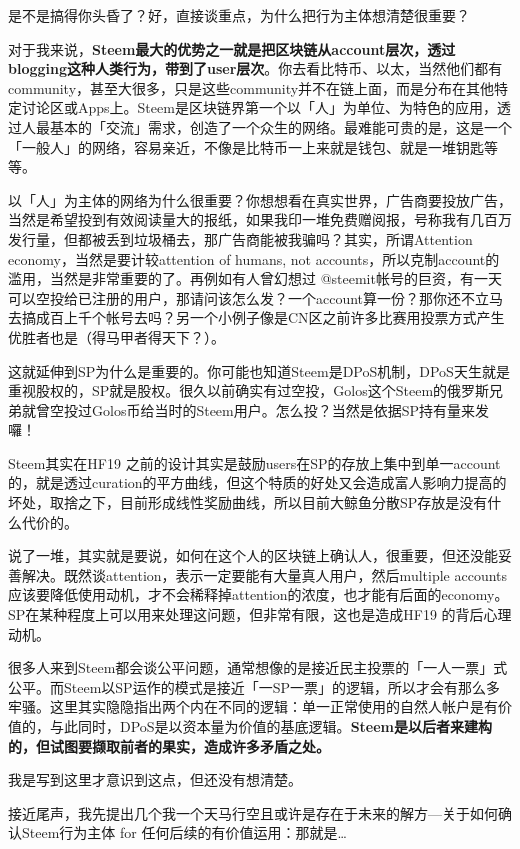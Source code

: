 \documentclass[]{ctexbook}
\begin{document}
是不是搞得你头昏了？好，直接谈重点，为什么把行为主体想清楚很重要？

对于我来说，\textbf{Steem最大的优势之一就是把区块链从account层次，透过blogging这种人类行为，带到了user层次}。你去看比特币、以太，当然他们都有community，甚至大很多，只是这些community并不在链上面，而是分布在其他特定讨论区或Apps上。Steem是区块链界第一个以「人」为单位、为特色的应用，透过人最基本的「交流」需求，创造了一个众生的网络。最难能可贵的是，这是一个「一般人」的网络，容易亲近，不像是比特币一上来就是钱包、就是一堆钥匙等等。

以「人」为主体的网络为什么很重要？你想想看在真实世界，广告商要投放广告，当然是希望投到有效阅读量大的报纸，如果我印一堆免费赠阅报，号称我有几百万发行量，但都被丢到垃圾桶去，那广告商能被我骗吗？其实，所谓Attention economy，当然是要计较attention of humans, not accounts，所以克制account的滥用，当然是非常重要的了。再例如有人曾幻想过 @steemit帐号的巨资，有一天可以空投给已注册的用户，那请问该怎么发？一个account算一份？那你还不立马去搞成百上千个帐号去吗？另一个小例子像是CN区之前许多比赛用投票方式产生优胜者也是（得马甲者得天下？）。

这就延伸到SP为什么是重要的。你可能也知道Steem是DPoS机制，DPoS天生就是重视股权的，SP就是股权。很久以前确实有过空投，Golos这个Steem的俄罗斯兄弟就曾空投过Golos币给当时的Steem用户。怎么投？当然是依据SP持有量来发囉！

Steem其实在HF19 之前的设计其实是鼓励users在SP的存放上集中到单一account的，就是透过curation的平方曲线，但这个特质的好处又会造成富人影响力提高的坏处，取捨之下，目前形成线性奖励曲线，所以目前大鲸鱼分散SP存放是没有什么代价的。

说了一堆，其实就是要说，如何在这个人的区块链上确认人，很重要，但还没能妥善解决。既然谈attention，表示一定要能有大量真人用户，然后multiple accounts应该要降低使用动机，才不会稀释掉attention的浓度，也才能有后面的economy。SP在某种程度上可以用来处理这问题，但非常有限，这也是造成HF19 的背后心理动机。

很多人来到Steem都会谈公平问题，通常想像的是接近民主投票的「一人一票」式公平。而Steem以SP运作的模式是接近「一SP一票」的逻辑，所以才会有那么多牢骚。这里其实隐隐指出两个内在不同的逻辑：单一正常使用的自然人帐户是有价值的，与此同时，DPoS是以资本量为价值的基底逻辑。\textbf{Steem是以后者来建构的，但试图要撷取前者的果实，造成许多矛盾之处。}

我是写到这里才意识到这点，但还没有想清楚。

接近尾声，我先提出几个我一个天马行空且或许是存在于未来的解方---关于如何确认Steem行为主体 for 任何后续的有价值运用：那就是\ldots{}
\end{document}
